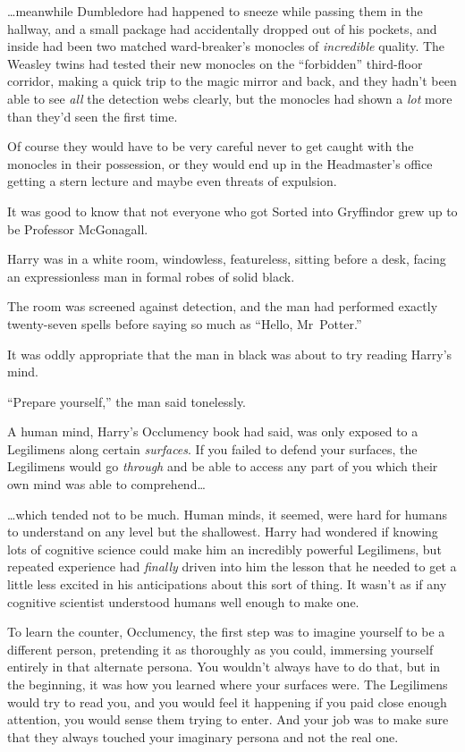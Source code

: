…meanwhile Dumbledore had happened to sneeze while passing them in the hallway, and a small package had accidentally dropped out of his pockets, and inside had been two matched ward-breaker’s monocles of \emph{incredible} quality. The Weasley twins had tested their new monocles on the “forbidden” third-floor corridor, making a quick trip to the magic mirror and back, and they hadn’t been able to see \emph{all} the detection webs clearly, but the monocles had shown a \emph{lot} more than they’d seen the first time.

Of course they would have to be very careful never to get caught with the monocles in their possession, or they would end up in the Headmaster’s office getting a stern lecture and maybe even threats of expulsion.

It was good to know that not everyone who got Sorted into Gryffindor grew up to be Professor McGonagall.

\later

Harry was in a white room, windowless, featureless, sitting before a desk, facing an expressionless man in formal robes of solid black.

The room was screened against detection, and the man had performed exactly twenty-seven spells before saying so much as “Hello, Mr~Potter.”

It was oddly appropriate that the man in black was about to try reading Harry’s mind.

“Prepare yourself,” the man said tonelessly.

A human mind, Harry’s Occlumency book had said, was only exposed to a Legilimens along certain \emph{surfaces}. If you failed to defend your surfaces, the Legilimens would go \emph{through} and be able to access any part of you which their own mind was able to comprehend…

…which tended not to be much. Human minds, it seemed, were hard for humans to understand on any level but the shallowest. Harry had wondered if knowing lots of cognitive science could make him an incredibly powerful Legilimens, but repeated experience had \emph{finally} driven into him the lesson that he needed to get a little less excited in his anticipations about this sort of thing. It wasn’t as if any cognitive scientist understood humans well enough to make one.

To learn the counter, Occlumency, the first step was to imagine yourself to be a different person, pretending it as thoroughly as you could, immersing yourself entirely in that alternate persona. You wouldn’t always have to do that, but in the beginning, it was how you learned where your surfaces were. The Legilimens would try to read you, and you would feel it happening if you paid close enough attention, you would sense them trying to enter. And your job was to make sure that they always touched your imaginary persona and not the real one.

